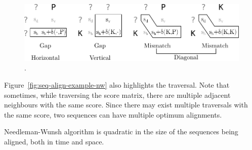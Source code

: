 \begin{figure}[h]
  \centering
  \includegraphics[scale=0.8]{src/background/figs/seq-align-rules}
  \caption{.}
  \label{fig:seq-align-rules}
\end{figure}


Figure~\ref{fig:seq-align-example-nw} also highlights the traversal. 
Note that sometimes, while traversing the score matrix, there are multiple adjacent neighbours with the same score.
Since there may exist multiple traversals with the same score, two sequences can have multiple optimum alignments.

Needleman-Wunsh algorithm is quadratic in the size of the sequences being aligned, both in time and space.

